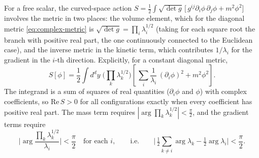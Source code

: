 For a free scalar, the curved-space action $S = \frac12\int \sqrt{\det g}\,
\big[\, g^{ij}\partial_i\phi\,\partial_j\phi + m^2\phi^2\big]$ involves the
metric in two places: the volume element, which for the diagonal metric
\eqref{eq:complex-metric} is $\sqrt{\det g} = \prod_i \lambda_i^{1/2}$
(taking for each square root the branch with positive real part, the one
continuously connected to the Euclidean case), and the inverse metric in the
kinetic term, which contributes $1/\lambda_i$ for the gradient in the $i$-th
direction. Explicitly, for a constant diagonal metric,
\begin{equation}
S[\phi] = \frac{1}{2}\int d^dy \;\Big(\prod_k \lambda_k^{1/2}\Big)
\left[\, \sum_i \frac{1}{\lambda_i}\,(\partial_i \phi)^2 + m^2 \phi^2 \right].
\label{eq:ks-scalar-action}
\end{equation}
The integrand is a sum of squares of real quantities ($\partial_i\phi$ and
$\phi$) with complex coefficients, so $\mathrm{Re}\, S > 0$ for all
configurations exactly when every coefficient has positive real part. The
mass term requires $|\arg \prod_k \lambda_k^{1/2}| < \frac\pi2$, and the
gradient terms require
\begin{equation}
\Big|\arg \frac{\prod_k \lambda_k^{1/2}}{\lambda_i}\Big| < \frac\pi2
\quad\text{for each } i,
\qquad\text{i.e.}\qquad
\Big|\, \tfrac12 \textstyle\sum_{k \ne i} \arg\lambda_k - \tfrac12
\arg\lambda_i \Big| < \frac\pi2 .
\label{eq:ks-scalar-condition}
\end{equation}

